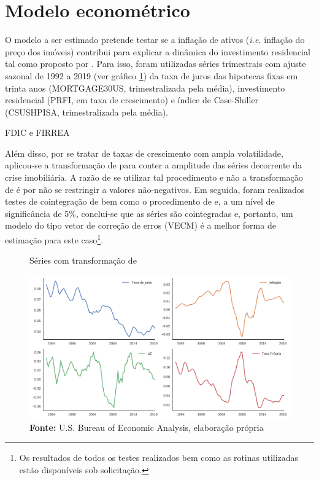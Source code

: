 \section{Modelo econométrico}
\label{Modelo_empirico}

O modelo a ser estimado pretende testar se a inflação de ativos (\textit{i.e.} inflação do preço dos imóveis) contribui para explicar a dinâmica do investimento residencial tal como proposto por \textcite{teixeira_crescimento_2015}. 
Para isso, foram utilizadas séries trimestrais com ajuste sazonal de 1992 a 2019 (ver gráfico \ref{YeoJhonson}) da taxa de juros das hipotecas fixas em trinta anos (MORTGAGE30US, trimestralizada pela média), investimento residencial (PRFI, em taxa de crescimento) e índice de Case-Shiller (CSUSHPISA, trimestralizada pela média).

FDIC e FIRREA



Além disso, por se tratar de taxas de crescimento com ampla volatilidade, aplicou-se a transformação de \textcite{yeo_new_2000} para conter a amplitude das séries decorrente da crise imobiliária. A razão de se utilizar tal procedimento e não a transformação de \textcite{box_analysis_1964} é por não se restringir a valores não-negativos. Em seguida, foram realizados testes de cointegração de \textcite{engle_co-integration_1987} bem como o procedimento de \textcite{johansen_estimation_1991} e, a um nível de significância de 5\%, conclui-se que as séries são cointegradas e, portanto, um modelo do tipo vetor de correção de erros (VECM) é a melhor forma de estimação para este caso\footnote{Os resultados de todos os testes realizados bem como as rotinas utilizadas estão disponíveis sob solicitação.}.

\begin{figure}[H]
	\centering
	\caption{Séries com transformação de \textcite{yeo_new_2000}}
	\label{YeoJhonson}
	\includegraphics[width=\textwidth]{../../Dados/Fatos_Estilizados/figs/YeoJohnson_All.png}
	\caption*{\textbf{Fonte:} U.S. Bureau of Economic Analysis, elaboração própria}
\end{figure}

